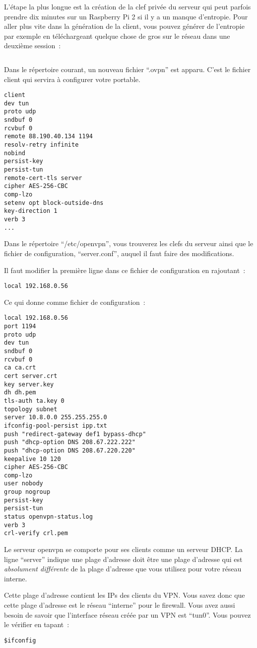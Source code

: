 L'étape la plus longue est la création de la clef privée du serveur qui peut parfois prendre dix minutes sur un Raspberry Pi 2 si il y a un manque d'entropie. Pour aller plus vite dans la génération de la client, vous pouvez générer de l'entropie par exemple en téléchargeant quelque chose de gros sur le réseau dans une deuxième session~:
\begin{verbatim}

\end{verbatim}



Dans le répertoire courant, un nouveau fichier ``.ovpn'' est apparu. C'est le fichier client qui servira à configurer votre portable.

\begin{verbatim}
client
dev tun
proto udp
sndbuf 0
rcvbuf 0
remote 88.190.40.134 1194
resolv-retry infinite
nobind
persist-key
persist-tun
remote-cert-tls server
cipher AES-256-CBC
comp-lzo
setenv opt block-outside-dns
key-direction 1
verb 3
...
\end{verbatim}

Dans le répertoire ``/etc/openvpn'', vous trouverez les clefs du serveur ainsi que le fichier de configuration, ``server.conf'',  auquel il faut faire des modifications.

Il faut modifier la première ligne dans ce fichier de configuration en rajoutant~:
\begin{verbatim}
local 192.168.0.56
\end{verbatim}

Ce qui donne comme fichier de configuration~:
\begin{verbatim}
local 192.168.0.56
port 1194
proto udp
dev tun
sndbuf 0
rcvbuf 0
ca ca.crt
cert server.crt
key server.key
dh dh.pem
tls-auth ta.key 0
topology subnet
server 10.8.0.0 255.255.255.0
ifconfig-pool-persist ipp.txt
push "redirect-gateway def1 bypass-dhcp"
push "dhcp-option DNS 208.67.222.222"
push "dhcp-option DNS 208.67.220.220"
keepalive 10 120
cipher AES-256-CBC
comp-lzo
user nobody
group nogroup
persist-key
persist-tun
status openvpn-status.log
verb 3
crl-verify crl.pem
\end{verbatim}

Le serveur openvpn se comporte pour ses clients comme un serveur DHCP. La ligne ``server'' indique une plage d'adresse doit être une plage d'adresse qui est \emph{absolument différente} de la plage d'adresse que vous utilisez pour votre réseau interne. 

Cette plage d'adresse contient les IPs des clients du VPN. Vous savez donc que cette plage d'adresse est le réseau ``interne'' pour le firewall. Vous avez aussi besoin de savoir que l'interface réseau créée par un VPN est ``tun0''. Vous pouvez le vérifier en tapant~:
\begin{verbatim}
$ifconfig
\end{verbatim}  

